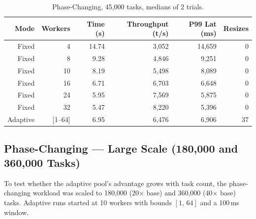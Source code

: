 \documentclass[12pt,a4paper]{article}
\begin{document}
\begin{table}[H]
\centering
\caption{Phase-Changing, 45,000 tasks, medians of 2 trials.}
\begin{tabular}{rrrrrr}
\toprule
\textbf{Mode} & \textbf{Workers} & \textbf{Time (s)}
  & \textbf{Throughput (t/s)} & \textbf{P99 Lat (ms)} & \textbf{Resizes} \\
\midrule
Fixed &  4 & 14.74 & 3,052 & 14,659 & 0 \\
Fixed &  8 &  9.28 & 4,846 &  9,251 & 0 \\
Fixed & 10 &  8.19 & 5,498 &  8,089 & 0 \\
Fixed & 16 &  6.71 & 6,703 &  6,648 & 0 \\
Fixed & 24 &  5.95 & 7,569 &  5,875 & 0 \\
Fixed & 32 &  5.47 & 8,220 &  5,396 & 0 \\
\rowcolor{rowblue}
Adaptive & [1--64] & 6.95 & 6,476 & 6,906 & 37 \\
\bottomrule
\end{tabular}
\label{tab:phase_medium}
\end{table}

\subsection{Phase-Changing --- Large Scale (180,000 and 360,000 Tasks)}
\label{sec:phase_large}

To test whether the adaptive pool's advantage grows with task count, the
phase-changing workload was scaled to 180,000 (20$\times$ base) and
360,000 (40$\times$ base) tasks.
Adaptive runs started at 10 workers with bounds $[1,\,64]$ and a 100\,ms
window.
\end{document}
